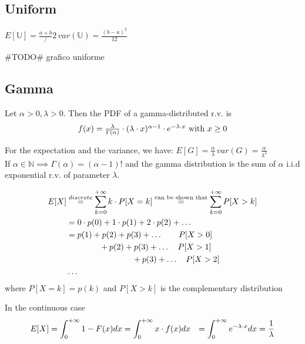 \subsection{Uniform}
$E[\mathbb{U}]=\frac{a+b}/2 \, var(\mathbb{U})=\frac{(b-a)^2}{12}$

\#TODO\# grafico uniforme

\subsection{Gamma}
Let $\alpha >0 , \lambda >0$. Then the PDF of a gamma-distributed r.v. is
\begin{equation}
  $$f(x) = \frac{\lambda}{\Gamma(\alpha)}\cdot (\lambda \cdot x)^{\alpha -1} \cdot e^{-\lambda \cdot x} \text{ with } x\ge 0$$
\end{equation}

For the expectation and the variance, we have: $E[G]=\frac{\alpha}{\lambda} \, var(G)=\frac{\alpha}{\lambda^2}$
\\ If $\alpha \in \mathbb{N} \implies \Gamma(\alpha) = (\alpha-1)!$ and the gamma
distribution is the sum of $\alpha$ i.i.d exponential r.v. of parameter $\lambda$.

\begin{equation} $$
  \begin{split}
  E[X]&\stackrel{discrete}{=} \sum\limits_{k=0}^{+\infty} k \cdot P[X=k]
  \stackrel{\text{can be shown  that}}{=} \sum\limits_{k=0}^{+\infty} P[X>k]\\
  &=0 \cdot p(0) + 1 \cdot p(1) + 2 \cdot p(2) + \dots \\
  &= p(1) + p(2) + p(3)+ \dots \qquad P[X>0]\\
  & \qquad \qquad + p(2) + p(3) +\dots \quad P[X>1]\\
  & \qquad \qquad \qquad \qquad + p(3)+ \dots \quad P[X>2] \\
  & \dots
  \end{split}$$
\end{equation}
where $P[X=k]=p(k)$ and $P[X>k]$ is the complementary distribution

In the continuous case
\begin{equation}$$
  \begin{split}
    E[X] &= \int_{0}^{+\infty} 1-F(x) dx = \int_{0}^{+\infty} x \cdot f(x) dx
    &=\int_{0}^{+\infty} e^{-\lambda \cdot x} dx = \frac{1}{\lambda}
  \end{split}$$
\end{equation}

